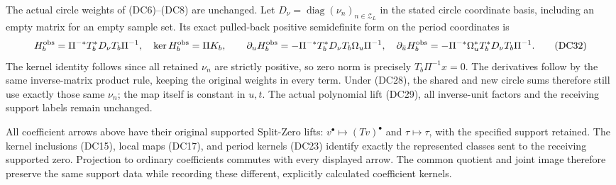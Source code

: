 The actual circle weights of (DC6)--(DC8) are unchanged.
Let $D_\nu=\operatorname{diag}(\nu_n)_{n\in\mathcal Z_L}$
in the stated circle coordinate basis, including an empty
matrix for an empty sample set.  Its exact pulled-back
positive semidefinite form on the period coordinates is
\[
 H_b^{\rm obs}=\Pi^{-*}T_b^*D_\nu T_b\Pi^{-1},
 \quad\ker H_b^{\rm obs}=\Pi K_b,\qquad
 \partial_uH_b^{\rm obs}
       =-\Pi^{-*}T_b^*D_\nu T_b\Omega_u\Pi^{-1},
 \quad
 \partial_{\bar u}H_b^{\rm obs}
       =-\Pi^{-*}\Omega_u^*T_b^*D_\nu T_b\Pi^{-1}.
 \tag{DC32}
\]
The kernel identity follows since all retained $\nu_n$ are
strictly positive, so zero norm is precisely $T_b\Pi^{-1}x=0$.
The derivatives follow by the same inverse-matrix product
rule, keeping the original weights in every term.
Under (DC28), the shared and new circle sums therefore still
use exactly those same $\nu_n$; the map itself is constant in
$u,t$.  The actual polynomial lift (DC29), all inverse-unit
factors and the receiving support labels remain unchanged.

All coefficient arrows above have their original supported
Split-Zero lifts: $v^\bullet\mapsto(Tv)^\bullet$ and
$\tau\mapsto\tau$, with the specified support retained.
The kernel inclusions (DC15), local maps (DC17), and period
kernels (DC23) identify exactly the represented classes sent to
the receiving supported zero.  Projection to ordinary
coefficients commutes with every displayed arrow.  The common
quotient and joint image therefore preserve the same support
data while recording these different, explicitly calculated
coefficient kernels.


\endgroup
